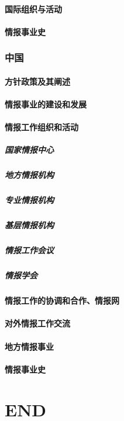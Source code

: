 \documentclass[UTF8]{../../ApplicationUniverse}
\begin{document}
        \subsubsection{国际组织与活动}
        \subsubsection{情报事业史}
    \subsection{中国}
        \subsubsection{方针政策及其阐述}
        \subsubsection{情报事业的建设和发展}
        \subsubsection{情报工作组织和活动}
            \paragraph{国家情报中心}
            \paragraph{地方情报机构}
            \paragraph{专业情报机构}
            \paragraph{基层情报机构}
            \paragraph{情报工作会议}
            \paragraph{情报学会}
        \subsubsection{情报工作的协调和合作、情报网}
        \subsubsection{对外情报工作交流}
        \subsubsection{地方情报事业}
        \subsubsection{情报事业史}


\chapter{END}
\end{document}
